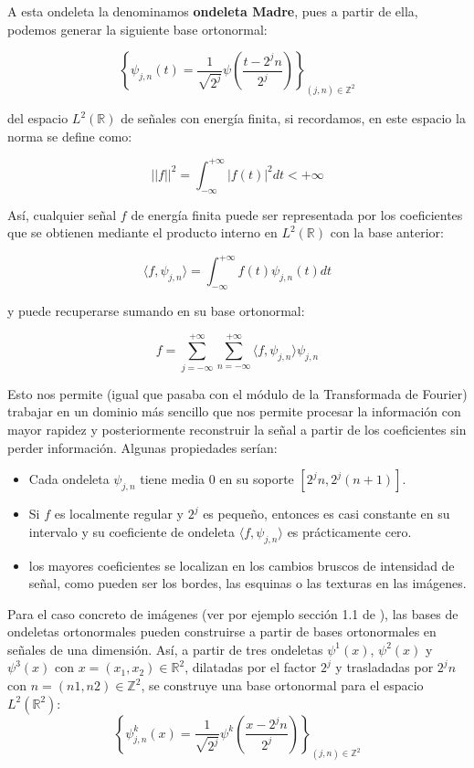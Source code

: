 \noindent A esta ondeleta la denominamos \textbf{ondeleta Madre}, pues a partir de ella, podemos generar la siguiente base ortonormal:

\medskip

$$\left \lbrace \psi_{j,n}(t)= \frac{1}{\sqrt{2^j}} \psi\left(\frac{t-2^jn}{2^j}\right) \right\rbrace_{(j,n) \in \mathbb{Z}^2}$$

\noindent del espacio $L^2(\mathbb{R})$ de señales con energía finita, si recordamos, en este espacio la norma se define como: 

\begin{definicion}
  $$||f||^2=\int_{-\infty}^{+\infty} |f(t)|^2 dt < +\infty$$
\end{definicion}

\noindent Así, cualquier señal $f$ de energía finita puede ser representada por los coeficientes que se obtienen mediante el producto interno en $L^2(\mathbb{R})$ con la base anterior: 

$$\langle f,\psi_{j,n} \rangle =\int_{-\infty}^{+\infty} f(t) \psi_{j,n} (t) dt  $$

\noindent y puede recuperarse sumando en su base ortonormal:

$$f=\sum_{j=-\infty}^{+\infty}\sum_{n=-\infty}^{+\infty}  \langle f,\psi_{j,n} \rangle \psi_{j,n} $$

\noindent Esto nos permite (igual que pasaba con el módulo de la Transformada de Fourier) trabajar en un dominio más sencillo que nos permite procesar la información con mayor rapidez y posteriormente reconstruir la señal a partir de los coeficientes sin perder información. Algunas propiedades serían: 

\begin{itemize}
  \item Cada ondeleta $\psi_{j,n}$ tiene media $0$ en su soporte $[2^jn, 2^j(n+1)]$.
  \item Si $f$ es localmente regular y $2^j$ es pequeño, entonces es casi constante en su intervalo y su coeficiente de ondeleta $\langle f,\psi_{j,n} \rangle$ es prácticamente cero.
  \item los mayores coeficientes se localizan en los cambios bruscos de intensidad de señal, como pueden ser los bordes, las esquinas o las texturas en las imágenes.
\end{itemize}

\noindent Para el caso concreto de imágenes (ver por ejemplo sección 1.1 de \cite{MallatWavelets}), las bases de ondeletas ortonormales pueden construirse a partir de bases ortonormales en señales de una dimensión. Así, a partir de tres ondeletas $\psi^1(x)$, $\psi^2(x)$ y$\psi^3(x)$ con $x=(x_1,x_2)\in \mathbb{R}^2$, dilatadas por el factor $2^j$ y trasladadas por $2^jn$ con $n=(n1,n2)\in \mathbb{Z}^2$, se construye una base ortonormal para el espacio $L^2(\mathbb{R}^2)$: 
$$\left \lbrace \psi_{j,n}^k(x)= \frac{1}{\sqrt{2^j}} \psi^k\left(\frac{x-2^jn}{2^j}\right) \right \rbrace_{(j,n) \in \mathbb{Z}^2}$$

